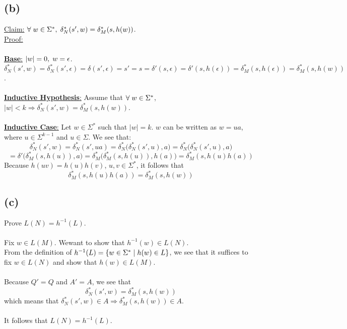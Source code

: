 \documentclass[11pt]{article}
\begin{document}
\subsection*{(b)}
\underline{Claim:} $\forall\hspace{1mm}w\in\Sigma^*,\hspace{1mm}\delta^*_N(s',w)=\delta^*_M(s,h(w))$. \\
\underline{Proof:} \\ \\
\underline{\textbf{Base}:} $|w|=0,\hspace{1mm}w=\epsilon$. $\delta^*_N(s',w)=\delta^*_N(s',\epsilon)=\delta(s',\epsilon)=s'=s=\delta'(s,\epsilon)=\delta'(s,h(\epsilon))=\delta^*_M(s,h(\epsilon))=\delta^*_M(s,h(w))$. \\ \\
\underline{\textbf{Inductive Hypothesis}:} Assume that $\forall\hspace{1mm}w\in\Sigma^*$, $|w|<k\Rightarrow\delta^*_N(s',w)=\delta^*_M(s,h(w))$. \\ \\
\underline{\textbf{Inductive Case}:} Let $w\in\Sigma^*$ such that $|w|=k$. $w$ can be written as $w=ua$, where $u\in\Sigma^{k-1}$ and $u\in\Sigma$. We see that:
\[\delta^*_N(s',w)=\delta^*_N(s',ua)=\delta^*_N\big(\delta^*_N(s',u),a\big)=\delta^*_N\big(\delta^*_N(s',u),a\big)\]
\[=\delta'\big(\delta^*_M(s,h(u)),a\big)=\delta^*_M\big(\delta^*_M(s,h(u)),h(a)\big)=\delta^*_M(s,h(u)h(a))\]
Because $h(uv)=h(u)h(v)$, $u,v\in\Sigma^*$, it follows that
\[\delta^*_M(s,h(u)h(a))=\delta^*_M(s,h(w))\]
\subsection*{(c)}
Prove $L(N)=h^{-1}(L)$. \\ \\
Fix $w\in L(M)$. Wewant to show that $h^{-1}(w)\in L(N)$. \\
From the definition of $h^{-1}(L)=\{w\in\Sigma^*\hspace{1mm}|\hspace{1mm}h(w)\in L\}$, we see that it suffices to fix $w\in L(N)$ and show that $h(w)\in L(M)$. \\ \\
Because $Q'=Q$ and $A'=A$, we see that
\[\delta^*_N(s',w)=\delta^*_M(s,h(w))\]
which means that $\delta^*_N(s',w)\in A\Rightarrow\delta^*_M(s,h(w))\in A$. \\ \\
It follows that $L(N)=h^{-1}(L)$.
\end{document}
